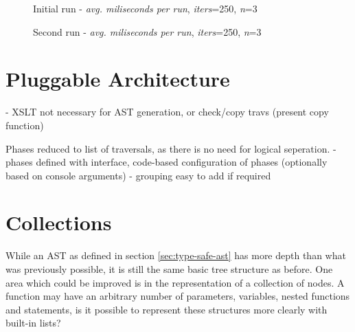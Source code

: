 \documentclass[twoside,openright]{uva-bachelor-thesis}
\begin{document}
			\begin{figure}
				\centering
				\caption{Initial run - \emph{avg. miliseconds per run}, \emph{iters}=250, \emph{n}=3}
				\label{fig:first-run}
			\end{figure}
			
			\begin{figure}
				\centering
				\caption{Second run - \emph{avg. miliseconds per run}, \emph{iters}=250, \emph{n}=3}
				\label{fig:second-run}
			\end{figure}
			
				
	\section{Pluggable Architecture}
		- XSLT not necessary for AST generation, or check/copy travs (present copy function)
		
		Phases reduced to list of traversals, as there is no need for logical seperation.
		- phases defined with interface, code-based configuration of phases (optionally based on console arguments)
		- grouping easy to add if required
	
	
	\section{Collections}
		While an AST as defined in section \ref{sec:type-safe-ast} has more depth than what was previously possible, it is still the same basic tree structure as before. One area which could be improved is in the representation of a collection of nodes. A function may have an arbitrary number of parameters, variables, nested functions and statements, is it possible to represent these structures more clearly with built-in lists?
		
\end{document}
